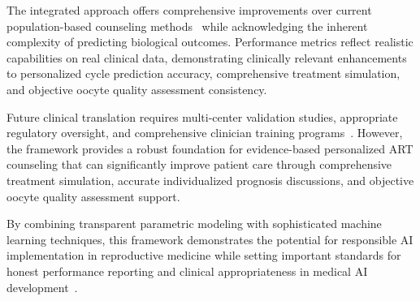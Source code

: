 The integrated approach offers comprehensive improvements over current population-based counseling methods~\cite{paternot2009observer,paternot2011multicentre} while acknowledging the inherent complexity of predicting biological outcomes. Performance metrics reflect realistic capabilities on real clinical data, demonstrating clinically relevant enhancements to personalized cycle prediction accuracy, comprehensive treatment simulation, and objective oocyte quality assessment consistency.

Future clinical translation requires multi-center validation studies, appropriate regulatory oversight, and comprehensive clinician training programs~\cite{fda2021ai,fda2022clinical,varoquaux2022machine}. However, the framework provides a robust foundation for evidence-based personalized ART counseling that can significantly improve patient care through comprehensive treatment simulation, accurate individualized prognosis discussions, and objective oocyte quality assessment support.

By combining transparent parametric modeling with sophisticated machine learning techniques, this framework demonstrates the potential for responsible AI implementation in reproductive medicine while setting important standards for honest performance reporting and clinical appropriateness in medical AI development~\cite{topol2019high,litjens2017survey}. 